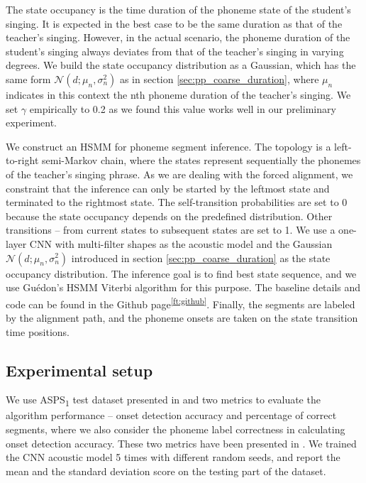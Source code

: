 The state occupancy is the time duration of the phoneme state of the student's singing. It is expected in the best case to be the same duration as that of the teacher's singing. However, in the actual scenario, the phoneme duration of the student's singing always deviates from that of the teacher's singing in varying degrees. We build the state occupancy distribution as a Gaussian, which has the same form $\mathcal{N} (d; {\mu_n}, \sigma_n^2)$ as in section \ref{sec:pp_coarse_duration}, where $\mu_n$ indicates in this context the nth phoneme duration of the teacher's singing. We set $\gamma$ empirically to 0.2 as we found this value works well in our preliminary experiment.

We construct an HSMM for phoneme segment inference. The topology is a left-to-right semi-Markov chain, where the states represent sequentially the phonemes of the teacher's singing phrase. As we are dealing with the forced alignment, we constraint that the inference can only be started by the leftmost state and terminated to the rightmost state. The self-transition probabilities are set to 0 because the state occupancy depends on the predefined distribution. Other transitions -- from current states to subsequent states are set to 1. We use a one-layer CNN with multi-filter shapes as the acoustic model \cite{Pons2017Timbre} and the Gaussian $\mathcal{N} (d; {\mu_n}, \sigma_n^2)$ introduced in section \ref{sec:pp_coarse_duration} as the state occupancy distribution. The inference goal is to find best state sequence, and we use Gu\'{e}don's HSMM Viterbi algorithm \cite{GUEDON20072379} for this purpose. The baseline details and code can be found in the Github page\textsuperscript{\ref{ft:github}}. Finally, the segments are labeled by the alignment path, and the phoneme onsets are taken on the state transition time positions.

\subsection{Experimental setup}

We use ASPS\textsubscript{1} test dataset presented in  and two metrics to evaluate the algorithm performance -- onset detection accuracy and percentage of correct segments, where we also consider the phoneme label correctness in calculating onset detection accuracy. These two metrics have been presented in . We trained the CNN acoustic model 5 times with different random seeds, and report the mean and the standard deviation score on the testing part of the dataset.

